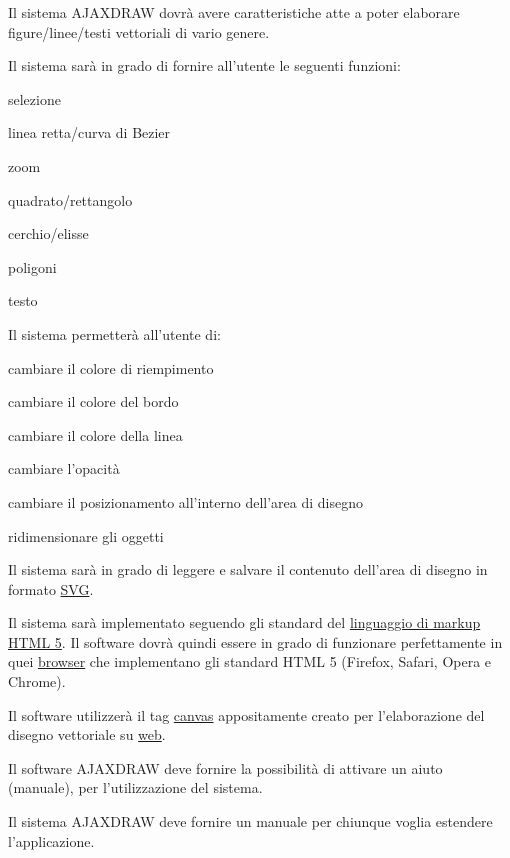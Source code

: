 \newpage


\begin{elenconumerato}{\subsecindent}
\item Il sistema AJAXDRAW dovr\`a avere caratteristiche atte a poter elaborare figure/linee/testi vettoriali di vario genere.
\item Il sistema sar\`a in grado di fornire all'utente le seguenti funzioni:

\begin{list}{-}{}
\item selezione
\item linea retta/curva di Bezier
\item zoom
\item quadrato/rettangolo
\item cerchio/elisse
\item poligoni
\item testo
\end{list}

\item Il sistema permetter\`a all'utente di:

\begin{list}{-}{}
\item cambiare il colore di riempimento
\item cambiare il colore del bordo
\item cambiare il colore della linea
\item cambiare l'opacit\`a
\item cambiare il posizionamento all'interno dell'area di disegno
\item ridimensionare gli oggetti
\end{list}

\item Il sistema sar\`a in grado di leggere e salvare il contenuto dell'area di disegno in formato \underline{SVG}.
\item Il sistema sar\`a implementato seguendo gli standard del \underline{linguaggio di markup} \underline{HTML 5}. Il software dovr\`a quindi essere in grado di funzionare perfettamente in quei {\underline{browser}} che implementano gli standard HTML 5 (Firefox, Safari, Opera e Chrome). 
\item Il software utilizzer\`a il tag \underline{canvas} appositamente creato per l'elaborazione del disegno vettoriale su {\underline{web}}.
\item Il software AJAXDRAW deve fornire la possibilit\`a di attivare un aiuto (manuale), per l'utilizzazione del sistema. 
\item Il sistema AJAXDRAW deve fornire un manuale per chiunque voglia estendere l'applicazione. 
\end{elenconumerato}

